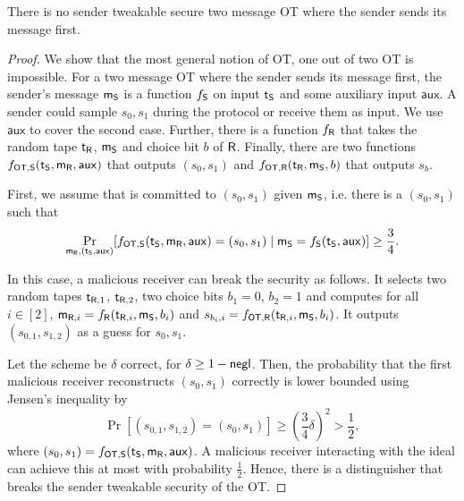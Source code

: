 \begin{lemma}\label{lem:nosendtweak}
There is no sender tweakable secure two message OT where the sender sends its message first. 
\end{lemma}

\newcommand{\PRF}{\ensuremath{\mathsf{PRF}}\xspace}
\newcommand{\aux}{\ensuremath{\mathsf{aux}}\xspace}

\begin{proof}
We show that the most general notion of OT, one out of two OT is impossible.  
For a two message OT where the sender sends its message first, the sender's message $\mathsf{m}_{\mathsf{S}}$ is a function $f_{\mathsf{S}}$ on input $\mathsf{t}_{\mathsf{S}}$ and some auxiliary input $\aux$. A sender could sample $s_0,s_1$ during the protocol or receive them as input. We use $\aux$ to cover the second case. Further, there is a function $f_{\mathsf{R}}$ that takes the random tape $\mathsf{t}_{\mathsf{R}}$, $\mathsf{m}_{\mathsf{S}}$ and choice bit $b$ of $\mathsf{R}$. Finally, there are two functions $f_{\OT,\send}(\tape_{\send},\mes_{\rec},\aux)$ that outputs $(s_0,s_1)$ and $f_{\mathsf{OT},\mathsf{R}}(\mathsf{t}_{\mathsf{R}},\mathsf{m}_{\mathsf{S}},b)$ that outputs $s_b$. 

First, we assume that \send is committed to $(s_0,s_1)$ given $\mathsf{m}_{\mathsf{S}}$, i.e. there is a $(s_0,s_1)$ such that
$$
\Pr_{\mes_{\rec}, (\tape_{\send},\aux)}[f_{\OT,\send}(\tape_{\send},\mes_{\rec},\aux)=(s_0,s_1)\mid \mes_{\send}=f_{\send}(\tape_{\send},\aux)]\geq\frac{3}{4}.
$$

In this case, a malicious receiver can break the security as follows. It selects two random tapes $\mathsf{t}_{\mathsf{R},1}$, $\mathsf{t}_{\mathsf{R},2}$, two choice bits $b_1=0$, $b_2=1$ and computes for all $i\in[2]$, $\mathsf{m}_{\mathsf{R},i}= f_{\mathsf{R}}(\mathsf{t}_{\mathsf{R},i},\mathsf{m}_{\mathsf{S}},b_i)$ and $s_{b_{i},i}=f_{\mathsf{OT},\mathsf{R}}(\mathsf{t}_{\mathsf{R},i},\mathsf{m}_{\mathsf{S}},b_i)$. It outputs $(s_{0,1},s_{1,2})$ as a guess for $s_0,s_1$.

Let the scheme be $\delta$ correct, for $\delta\geq 1-\mathsf{negl}$. Then, the probability that the first malicious receiver reconstructs $(s_0,s_1)$ correctly is lower bounded using Jensen's inequality by
$$
\Pr[(s_{0,1},s_{1,2})=(s_0,s_1)]\geq \left(\frac{3}{4}\delta\right)^2> \frac{1}{2},
$$
where $(s_0,s_1)=f_{\OT,\send}(\tape_{\send},\mes_{\rec},\aux)$. A malicious receiver interacting with the ideal \OT can achieve this at most with probability $\frac{1}{2}$. Hence, there is a distinguisher that breaks the sender tweakable security of the OT.


\end{proof}
